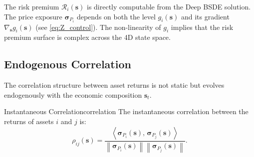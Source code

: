 \documentclass[11pt,letterpaper,oneside]{article}
\numberwithin{equation}{section}
\newcommand{\1}{\mathbf{1}}
\newcommand{\norm}[1]{\left\lVert #1\right\rVert}
\newcommand{\ip}[2]{\left\langle #1,\,#2\right\rangle}
\begin{document}
\begin{tcolorbox}[didacticstyle,title={Computational Link: Evaluating Risk Premia}]
  The risk premium $\mathcal{R}_i(\bm{s})$ is directly computable from the Deep BSDE solution. The price exposure $\bm{\sigma}_{P_i}$ depends on both the level $g_i(\bm{s})$ and its gradient $\nabla_{\bm{s}} g_i(\bm{s})$ (see \cref{eq:Z_control}). The non-linearity of $g_i$ implies that the risk premium surface is complex across the 4D state space.

  \begin{center}
   \label{fig:risk_premium_surface}
  \end{center}
\end{tcolorbox}

\subsection{Endogenous Correlation}

The correlation structure between asset returns is not static but evolves endogenously with the economic composition $\bm{s}_t$.

\begin{definition}{Instantaneous Correlation}{correlation}
The instantaneous correlation between the returns of assets $i$ and $j$ is:
\begin{equation}\label{eq:correlation}
  \rho_{ij}(\bm{s}) = \frac{\ip{\bm{\sigma}_{P_i}(\bm{s})}{\bm{\sigma}_{P_j}(\bm{s})}}{\norm{\bm{\sigma}_{P_i}(\bm{s})} \norm{\bm{\sigma}_{P_j}(\bm{s})}}.
\end{equation}
\end{definition}
\end{document}
